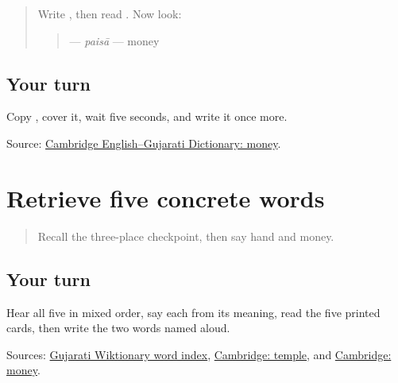 \begin{quote}
Write \textbf{}, then read \textbf{}. Now look:

\begin{quote}
\textbf{} — \emph{paisā} — money
\end{quote}
\end{quote}

\subsection*{Your turn}

Copy \textbf{}, cover it, wait five seconds, and write it once more.

\begin{tcolorbox}[breakable,colback=teal!4,colframe=teal!35!black,title={Before you move on}]
Source: \href{https://dictionary.cambridge.org/dictionary/english-gujarati/money}{Cambridge English–Gujarati Dictionary: money}.
\end{tcolorbox}
\section[\texorpdfstring{\gu{બજાર} — \gu{ઘર} — \gu{મંદિર} … (bajār — ghar …)}{બજાર — ઘર — મંદિર … (bajār — ghar …)}]{Retrieve five concrete words}

\label{lesson:GU-R21-travel-five}



\begin{quote}
Recall the three-place checkpoint, then say hand and money.
\end{quote}

\subsection*{Your turn}
Hear all five in mixed order, say each from its meaning, read the five printed cards, then write the two words named aloud.

\begin{tcolorbox}[breakable,colback=teal!4,colframe=teal!35!black,title={Before you move on}]
Sources: \href{https://gu.wiktionary.org/wiki/\%E0\%AA\%B5\%E0\%AA\%BF\%E0\%AA\%95\%E0\%AA\%BF\%E0\%AA\%95\%E0\%AB\%8B\%E0\%AA\%B6:\%E0\%AA\%B6\%E0\%AA\%AC\%E0\%AB\%8D\%E0\%AA\%A6\_\%E0\%AA\%85\%E0\%AA\%A8\%E0\%AB\%81\%E0\%AA\%95\%E0\%AB\%8D\%E0\%AA\%B0\%E0\%AA\%AE\%E0\%AA\%A3\%E0\%AA\%BF\%E0\%AA\%95\%E0\%AA\%BE}{Gujarati Wiktionary word index}, \href{https://dictionary.cambridge.org/dictionary/english-gujarati/temple}{Cambridge: temple}, and \href{https://dictionary.cambridge.org/dictionary/english-gujarati/money}{Cambridge: money}.
\end{tcolorbox}
